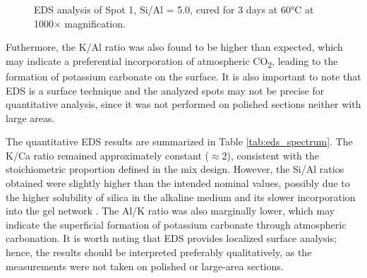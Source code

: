 \begin{figure}[H]
    \centering
    \hfill
    \caption{EDS analysis of Spot 1, Si/Al = 5.0, cured for 3 days at 60°C at 1000× magnification.}
    \label{fig:eds_spot1_5-0}
\end{figure}


Futhermore, the K/Al ratio was also found to be higher than expected, which may indicate a preferential incorporation of atmospheric CO\textsubscript{2}, leading to the formation of potassium carbonate on the surface.
It is also important to note that EDS is a surface technique and the analyzed spots may not be precise for quantitative analysis, since it was not performed on polished sections neither with large areas.

The quantitative EDS results are summarized in Table \ref{tab:eds_spectrum}.
The K/Ca ratio remained approximately constant ($\approx$2), consistent with the stoichiometric proportion defined in the mix design.
However, the Si/Al ratios obtained were slightly higher than the intended nominal values, possibly due to the higher solubility of silica in the alkaline medium and its slower incorporation into the gel network \cite{chen2024synthesis}.
The Al/K ratio was also marginally lower, which may indicate the superficial formation of potassium carbonate through atmospheric carbonation.
It is worth noting that EDS provides localized surface analysis; hence, the results should be interpreted preferably qualitatively, as the measurements were not taken on polished or large-area sections.


